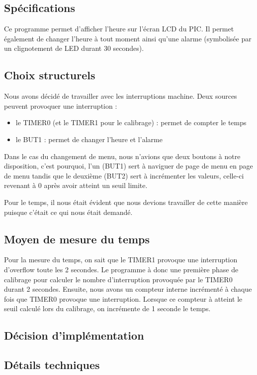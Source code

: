 \subsection*{Spécifications}

Ce programme permet d'afficher l'heure sur l'écran LCD du PIC. Il permet également de changer l'heure à tout moment ainsi qu'une alarme (symbolisée par un clignotement de LED durant 30 secondes).

\subsection*{Choix structurels}

Nous avons décidé de travailler avec les interruptions machine. Deux sources peuvent provoquer une interruption :
\begin{itemize}
	\item le TIMER0 (et le TIMER1 pour le calibrage) : permet de compter le temps
	\item le BUT1 : permet de changer l'heure et l'alarme 
\end{itemize}

Dans le cas du changement de menu, nous n'avions que deux boutons à notre disposition, c'est pourquoi, l'un (BUT1) sert à naviguer de page de menu en page de menu tandis que le deuxième (BUT2) sert à incrémenter les valeurs, celle-ci revenant à 0 après avoir atteint un seuil limite.

Pour le temps, il nous était évident que nous devions travailler de cette manière puisque c'était ce qui nous était demandé.

\subsection*{Moyen de mesure du temps}

Pour la mesure du temps, on sait que le TIMER1 provoque une interruption d'overflow toute les 2 secondes. Le programme à donc une première phase de calibrage pour calculer le nombre d'interruption provoquée par le TIMER0 durant 2 secondes. Ensuite, nous avons un compteur interne incrémenté à chaque fois que TIMER0 provoque une interruption. Lorsque ce compteur à atteint le seuil calculé lors du calibrage, on incrémente de 1 seconde le temps.

\subsection*{Décision d'implémentation}

\subsection*{Détails techniques}

